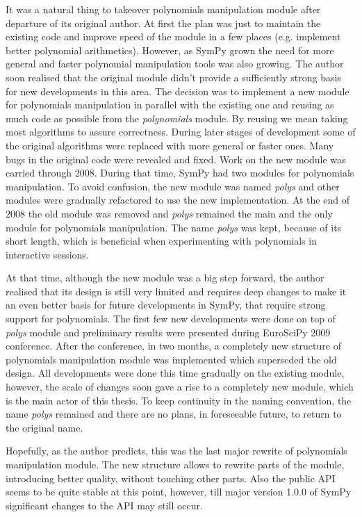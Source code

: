 It was a natural thing to takeover polynomials manipulation module after departure of its original
author. At first the plan was just to maintain the existing code and improve speed of the module in
a few places (e.g. implement better polynomial arithmetics). However, as SymPy grown the need for
more general and faster polynomial manipulation tools was also growing. The author soon realised that
the original module didn't provide a sufficiently strong basis for new developments in this area. The
decision was to implement a new module for polynomials manipulation in parallel with the existing one
and reusing as much code as possible from the \emph{polynomials} module. By reusing we mean taking most
algorithms to assure correctness. During later stages of development some of the original algorithms
were replaced with more general or faster ones.  Many bugs in the original code were revealed and fixed.
Work on the new module was carried through 2008. During that time, SymPy had two modules for polynomials
manipulation. To avoid confusion, the new module was named \emph{polys} and other modules were gradually
refactored to use the new implementation.  At the end of 2008 the old module was removed and \emph{polys}
remained the main and the only module for polynomials manipulation. The name \emph{polys} was kept, because
of its short length, which is beneficial when experimenting with polynomials in interactive sessions.

At that time, although the new module was a big step forward, the author realised that its design is
still very limited and requires deep changes to make it an even better basis for future developments
in SymPy, that require strong support for polynomials. The first few new developments were done on
top of \emph{polys} module and preliminary results were presented during EuroSciPy 2009 conference. After
the conference, in two months, a completely new structure of polynomials manipulation module was
implemented which superseded the old design. All developments were done this time gradually on the
existing module, however, the scale of changes soon gave a rise to a completely new module, which
is the main actor of this thesis. To keep continuity in the naming convention, the name \emph{polys}
remained and there are no plans, in foreseeable future, to return to the original name.

Hopefully, as the author predicts, this was the last major rewrite of polynomials manipulation module.
The new structure allows to rewrite parts of the module, introducing better quality, without touching
other parts. Also the public API seems to be quite stable at this point, however, till major version
1.0.0 of SymPy significant changes to the API may still occur.


